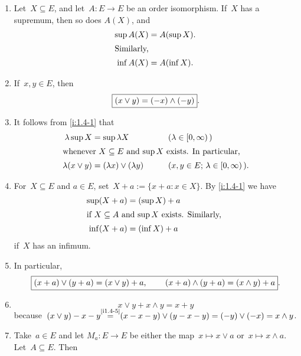 \documentclass[main.tex]{subfiles}
\begin{document}
\begin{enumerate}
\item %
\label{i:1.4-1}
Let~$X\subseteq E$, and let~$A\colon E\rightarrow E$ 
be an order isomorphism.
If~$X$ has a supremum,
then so does $A(X)$,
and
\begin{align*}
\sup A(X) &= A(\sup X)
\htam{.} \\
\intertext{%
Similarly, %
}
\inf A(X) &= A(\inf X)
\htam{.}
\end{align*}
\item %
If~$x,y\in E$, then
\begin{equation*}
\fbox{$  (x\vee y) = (-x)\wedge(-y)  $}
\textnormal{.}
\end{equation*}
\item %
It follows from \ref{i:1.4-1} that
\begin{alignat*}
\lambda \sup X &= \sup \lambda X \qquad &&(\lambda \in [0,\infty)\,) \\
\intertext{%
whenever~$X\subseteq E$ and~$\sup X$ exists.
In particular, }
\lambda (x \vee y) &=  (\lambda x) \vee (\lambda y) 
  \qquad &&(x,y\in E\htam{; }\lambda\in[0,\infty)\,)\htam{.}
\end{alignat*}
\item %
For~$X\subseteq E$ and $a\in E$,
set~$X+a:=\{x+a\colon x\in X\}$.
By \ref{i:1.4-1} we have
\begin{align*}
\sup(X+a) &= (\sup X) + a \\
\intertext{%
if $X\subseteq A$ and $\sup X$ exists.
Similarly, }
\inf (X+a) &= (\inf X)+a
\end{align*}
if~$X$ has an infimum.
\item %
In particular,
\begin{equation*}
\label{i1.4-5}
\frmd{%
(x+a)\vee   (y+a)=(x\vee y)+a
\htam{, } \qquad 
(x+a)\wedge (y+a)=(x\wedge y)+a }
\htam{.}
\end{equation*}
\item %
\label{i1.4-6}
\begin{equation*}
x\vee y + x\wedge y = x+y
\end{equation*}
because~$(x\vee y)-x-y 
\smash{\stackrel{\textnormal{\ref{i1.4-5}}}{=}}
(x-x-y)\vee(y-x-y)=(-y)\vee(-x)=x\wedge y$.
\item %
Take~$a\in E$ and let $M_a\colon E\rightarrow E$ 
be either the map~$x\mapsto x\vee a$
or~$x\mapsto x\wedge a$. 
Let~$A\subseteq E$.
Then
\begin{align*}

\end{align*}
\end{enumerate}
\end{document}
